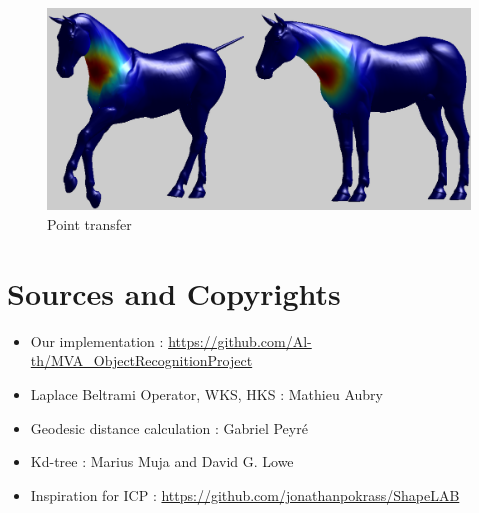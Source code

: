 \documentclass[10pt,twocolumn,letterpaper]{article}
\begin{document}
\begin{figure}[h]
\centering
\includegraphics[width=.4\textwidth]{Images/pointTransfer.png}
\caption{Point transfer}
\label{refinement}
\end{figure}




\section*{Sources and Copyrights}
\begin{itemize}
\setlength\itemsep{0.01em}
\item{Our implementation : \url{https://github.com/Al-th/MVA_ObjectRecognitionProject}}
\item{Laplace Beltrami Operator, WKS, HKS : Mathieu Aubry}
\item{Geodesic distance calculation : Gabriel Peyré}
\item{Kd-tree : Marius Muja and David G. Lowe}
\item{Inspiration for ICP : \url{https://github.com/jonathanpokrass/ShapeLAB}}
\end{itemize}


{\small


}
\end{document}

